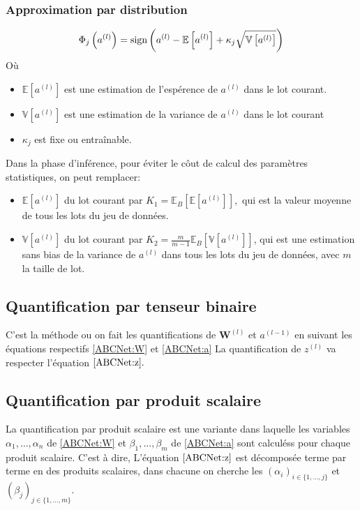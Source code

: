 \subsubsection{Approximation par distribution}
\begin{equation}
	\Phi_j\left(a^{(l)}\right)=\operatorname{sign}\left( a^{(l)}-\mathbb{E}\left[a^{(l)} \right] + \kappa_j \sqrt{\mathbb{V}\left[ a^{(l)} \right]}\right)
\end{equation}
Où \begin{itemize}
	\item $\mathbb{E}\left[ a^{(l)} \right]$ est une estimation de l'espérence de $a^{(l)}$ dans le lot courant.
	\item  $\mathbb{V}\left[a^{(l)} \right]$ est une estimation de la variance de $a^{(l)}$ dans le lot courant
	\item $\kappa_j$ est fixe ou entraînable.
\end{itemize}

Dans la phase d'inférence, pour éviter le côut de calcul des paramètres statistiques, on peut remplacer:
\begin{itemize}
	\item $\mathbb{E}\left[ a^{(l)} \right]$ du lot courant par $K_1=\mathbb{E}_B\left[\mathbb{E}\left[ a^{(l)} \right]\right],$ qui est la valeur moyenne de tous les lots du jeu de données.
	\item $\mathbb{V}\left[ a^{(l)} \right]$ du lot courant par $K_2=\frac{m}{m-1}\mathbb{E}_B\left[\mathbb{V}\left[a^{(l)} \right]\right]$, qui est une estimation sans bias de la variance de $a^{(l)}$ dans tous les lots du jeu de données, avec $m$ la taille de lot.
\end{itemize}

\subsection{Quantification par tenseur binaire}
C'est la méthode ou on fait les quantifications de $\boldsymbol{W}^{(l)}$ et $a^{(l-1)}$ en suivant les équations respectifs \eqref{ABCNet:W} et \eqref{ABCNet:a}
\newline La quantification de $z^{(l)}$ va respecter l'équation $\eqref{ABCNet:z}.$

\subsection{Quantification par produit scalaire}
La quantification par produit scalaire est une variante dans laquelle les variables $\alpha_1,\dots,\alpha_n$ de \eqref{ABCNet:W} et $\beta_1,\dots,\beta_m$ de \eqref{ABCNet:a} sont calculéss pour chaque produit scalaire.
\newline C'est à dire, L'équation $\eqref{ABCNet:z}$ est décomposée terme par terme en des produits scalaires, dans chacune on cherche les $(\alpha_i)_{i\in\{1,\dots,j\}}$ et $(\beta_j)_{j\in\{1,\dots,m\}}.$
